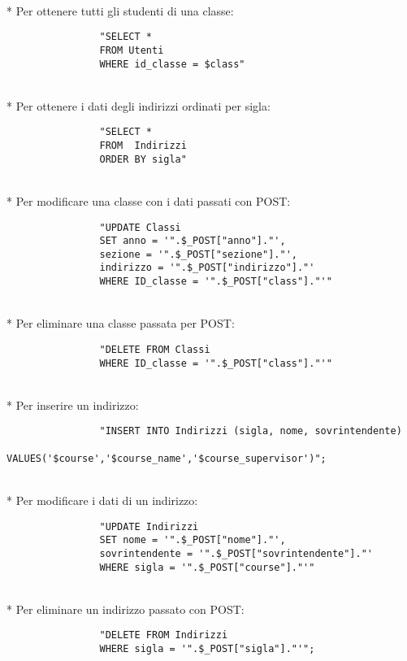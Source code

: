 \documentclass[12pt]{article}
\begin{document}
\\*
\noindent
Per ottenere tutti gli studenti di una classe:
\begin{verbatim}
                "SELECT * 
                FROM Utenti
                WHERE id_classe = $class"
\end{verbatim}      

\\*
\noindent
Per ottenere i dati degli indirizzi ordinati per sigla:
\begin{verbatim}   
                "SELECT * 
                FROM  Indirizzi
                ORDER BY sigla"
\end{verbatim}

\\*
\noindent
Per modificare una classe con i dati passati con POST:
\begin{verbatim}
                "UPDATE Classi 
                SET anno = '".$_POST["anno"]."',
                sezione = '".$_POST["sezione"]."',
                indirizzo = '".$_POST["indirizzo"]."'
                WHERE ID_classe = '".$_POST["class"]."'"
\end{verbatim}

\\*
\noindent
Per eliminare una classe passata per POST:
\begin{verbatim}
                "DELETE FROM Classi 
                WHERE ID_classe = '".$_POST["class"]."'"
\end{verbatim}

\\*
\noindent
Per inserire un indirizzo:
\begin{verbatim}
                "INSERT INTO Indirizzi (sigla, nome, sovrintendente)
                VALUES('$course','$course_name','$course_supervisor')";
\end{verbatim}

\\*
\newpage
\noindent
Per modificare i dati di un indirizzo:
\begin{verbatim}
                "UPDATE Indirizzi 
                SET nome = '".$_POST["nome"]."',
                sovrintendente = '".$_POST["sovrintendente"]."'
                WHERE sigla = '".$_POST["course"]."'"
\end{verbatim}

\\*
\noindent
Per eliminare un indirizzo passato con POST:
\begin{verbatim}
                "DELETE FROM Indirizzi 
                WHERE sigla = '".$_POST["sigla"]."'";
\end{verbatim}
\end{document}
